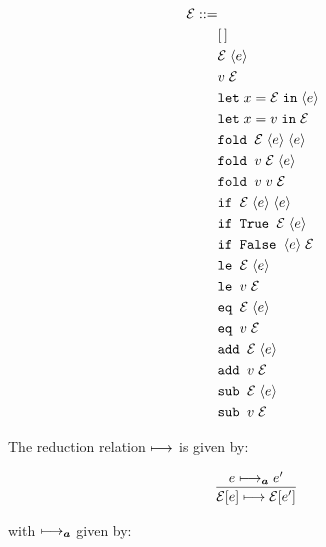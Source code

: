 \documentclass[10pt]{article}
\begin{document}
{\footnotesize
\begin{align*}
  \mathcal{E} ::=\\
    &[\,]\\
    &\mathcal{E}\; \langle e \rangle\\
    &v\; \mathcal{E}\\
    &\texttt{let}\; x = \mathcal{E}\; \texttt{in}\; \langle e \rangle\\
    &\texttt{let}\; x = v\; \texttt{in}\; \mathcal{E}\\
    &\texttt{fold } \mathcal{E}\; \langle e \rangle\; \langle e \rangle\\
    &\texttt{fold } v\; \mathcal{E}\; \langle e \rangle\\
    &\texttt{fold } v\; v\; \mathcal{E}\\
    &\texttt{if } \mathcal{E}\; \langle e \rangle\; \langle e \rangle\\
    &\texttt{if True } \mathcal{E}\; \langle e \rangle\\
    &\texttt{if False } \langle e \rangle\; \mathcal{E}\\
    &\texttt{le } \mathcal{E}\; \langle e \rangle\\
    &\texttt{le } v\; \mathcal{E}\\
    &\texttt{eq } \mathcal{E}\; \langle e \rangle\\
    &\texttt{eq } v\; \mathcal{E}\\
    &\texttt{add } \mathcal{E}\; \langle e \rangle\\
    &\texttt{add } v\; \mathcal{E}\\
    &\texttt{sub } \mathcal{E}\; \langle e \rangle\\
    &\texttt{sub } v\; \mathcal{E}\\
\end{align*}
}

The reduction relation $\longmapsto$ is given by:

\[
  \begin{array}{c}
    \labinfer{\mathcal{E}[e] \reduces \mathcal{E}[e']}{e \reducesA e'}
  \end{array}
\]

with $\longmapsto_{\boldsymbol{a}}$ given by:
\end{document}
